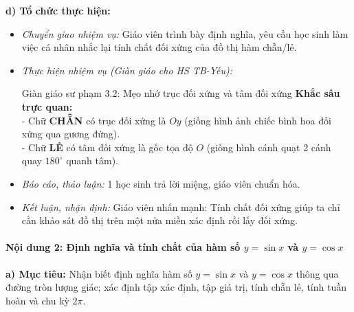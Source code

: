 \documentclass[12pt, a4paper]{article}
\begin{document}
\textbf{d) Tổ chức thực hiện:}
\begin{itemize}[leftmargin=0.6cm]
    \item \textit{Chuyển giao nhiệm vụ:} Giáo viên trình bày định nghĩa, yêu cầu học sinh làm việc cá nhân nhắc lại tính chất đối xứng của đồ thị hàm chẵn/lẻ.
    \item \textit{Thực hiện nhiệm vụ (Giàn giáo cho HS TB-Yếu):}
    \begin{scaffoldbox}{Giàn giáo sư phạm 3.2: Mẹo nhớ trục đối xứng và tâm đối xứng}
        \textbf{Khắc sâu trực quan:}\\
        - Chữ \textbf{CHẴN} có trục đối xứng là $Oy$ (giống hình ảnh chiếc bình hoa đối xứng qua gương đứng).\\
        - Chữ \textbf{LẺ} có tâm đối xứng là gốc tọa độ $O$ (giống hình cánh quạt 2 cánh quay $180^\circ$ quanh tâm).
    \end{scaffoldbox}
    \item \textit{Báo cáo, thảo luận:} 1 học sinh trả lời miệng, giáo viên chuẩn hóa.
    \item \textit{Kết luận, nhận định:} Giáo viên nhấn mạnh: Tính chất đối xứng giúp ta chỉ cần khảo sát đồ thị trên một nửa miền xác định rồi lấy đối xứng.
\end{itemize}

\paragraph{Nội dung 2: Định nghĩa và tính chất của hàm số $y = \sin x$ và $y = \cos x$}
\textbf{a) Mục tiêu:} Nhận biết định nghĩa hàm số $y = \sin x$ và $y = \cos x$ thông qua đường tròn lượng giác; xác định tập xác định, tập giá trị, tính chẵn lẻ, tính tuần hoàn và chu kỳ $2\pi$.
\end{document}
